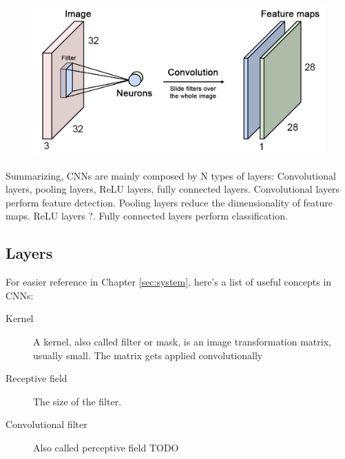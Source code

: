 \begin{figure}[htb]
  \begin{center}
    \includegraphics[width=\textwidth]{gfx/conv-layer-2}
  \end{center}
  \caption{}
  \label{fig:sec:concepts:conv-net}
\end{figure}


Summarizing, CNNs are mainly composed by N types of layers: Convolutional layers, pooling layers, ReLU layers, fully connected layers.
Convolutional layers perform feature detection.
Pooling layers reduce the dimensionality of feature maps.
ReLU layers ?.
Fully connected layers perform classification.

\subsection{Layers}
\label{sub:concepts:convolutional-neural-networks:layers}

\makeatletter
\renewcommand\paragraph{\@startsection{paragraph}{4}{\z@}%
  {-3.25ex \@plus -1ex \@minus -0.2ex}%
  {0.01pt}%
  {\raggedsection\normalfont\sectfont\nobreak\size@paragraph}%
}
\makeatother


For easier reference in Chapter \ref{sec:system}, here's a list of useful concepts in CNNs:

\begin{description}


  \item[Kernel]
  A kernel, also called filter or mask, is an image transformation matrix, usually small. The matrix gets applied convolutionally

  \item[Receptive field]
  The size of the filter.

  \item[Convolutional filter]
  Also called perceptive field
  TODO
  \todo[inline]{}
\end{description}

